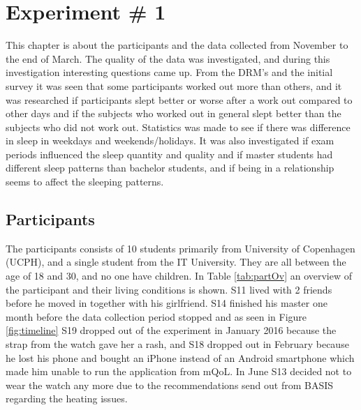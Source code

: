 \documentclass[12pt]{article} %
\begin{document}
\newpage	
\section{Experiment \# 1}
\label{sec:experiment1}
This chapter is about the participants and the data collected from November to the end of March. The quality of the data was investigated, and during this investigation interesting questions came up. From the DRM's and the initial survey it was seen that some participants worked out more than others, and it was researched if participants slept better or worse after a work out compared to other days and if the subjects who worked out in general slept better than the subjects who did not work out. Statistics was made to see if there was difference in sleep in weekdays and weekends/holidays. It was also investigated if exam periods influenced the sleep quantity and quality and if master students had different sleep patterns than bachelor students, and if being in a relationship seems to affect the sleeping patterns. 


\subsection{Participants} \label{sec:participants}
The participants consists of 10 students primarily from University of Copenhagen (UCPH), and a single student from the IT University. They are all between the age of 18 and 30, and no one have children. In Table \ref{tab:partOv} an overview of the participant and their living conditions is shown. S11 lived with 2 friends before he moved in together with his girlfriend. S14 finished his master one month before the data collection period stopped and as seen in Figure \ref{fig:timeline} S19 dropped out of the experiment in January 2016 because the strap from the watch gave her a rash, and S18 dropped out in February because he lost his phone and bought an iPhone instead of an Android smartphone which made him unable to run the application from mQoL. In June S13 decided not to wear the watch any more due to the recommendations send out from BASIS regarding the heating issues. 
\end{document}

